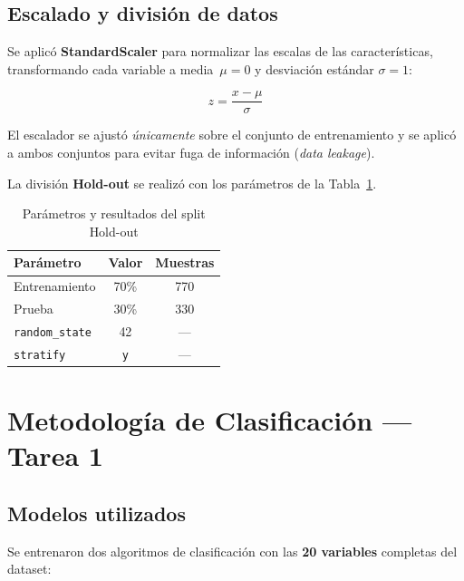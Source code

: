 \documentclass[12pt, letterpaper]{article}
\begin{document}
\subsection{Escalado y división de datos}

Se aplicó \textbf{StandardScaler} para normalizar las escalas de las
características, transformando cada variable a media~$\mu = 0$ y desviación
estándar $\sigma = 1$:

\begin{equation}
    z = \frac{x - \mu}{\sigma}
\end{equation}

El escalador se ajustó \emph{únicamente} sobre el conjunto de entrenamiento
y se aplicó a ambos conjuntos para evitar fuga de información
(\textit{data leakage}).

La división \textbf{Hold-out} se realizó con los parámetros de la
Tabla~\ref{tab:split}.

\begin{table}[H]
    \centering
    \caption{Parámetros y resultados del split Hold-out}
    \label{tab:split}
    \begin{tabular}{lcc}
        \toprule
        \textbf{Parámetro} & \textbf{Valor} & \textbf{Muestras} \\
        \midrule
        \rowcolor{rowgray} Entrenamiento & 70\% & 770 \\
        Prueba         & 30\% & 330 \\
        \rowcolor{rowgray} \texttt{random\_state} & 42 & --- \\
        \texttt{stratify} & \texttt{y} & --- \\
        \bottomrule
    \end{tabular}
\end{table}

\section{Metodología de Clasificación — Tarea 1}

\subsection{Modelos utilizados}

Se entrenaron dos algoritmos de clasificación con las \textbf{20 variables}
completas del dataset:
\end{document}
